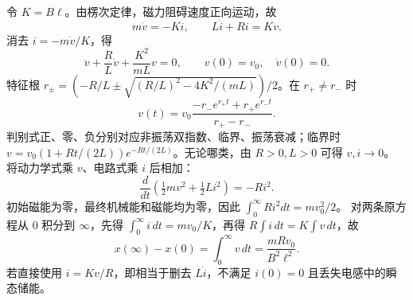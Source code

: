 令 \(K=B\ell\)。由楞次定律，磁力阻碍速度正向运动，故
\[m\dot v=-Ki,\qquad L\dot i+Ri=Kv.\]
消去 \(i=-m\dot v/K\)，得
\[\ddot v+\frac RL\dot v+\frac{K^2}{mL}v=0,\qquad v(0)=v_0,\quad\dot v(0)=0.\]
特征根 \(r_\pm=(-R/L\pm\sqrt{(R/L)^2-4K^2/(mL)})/2\)。在 \(r_+\ne r_-\) 时
\[v(t)=v_0\frac{-r_-e^{r_+t}+r_+e^{r_-t}}{r_+-r_-}.\]
判别式正、零、负分别对应非振荡双指数、临界、振荡衰减；临界时 \(v=v_0(1+Rt/(2L))e^{-Rt/(2L)}\)。无论哪类，由 \(R>0,L>0\) 可得 \(v,i\to0\)。
将动力学式乘 \(v\)、电路式乘 \(i\) 后相加：
\[\frac d{dt}\left(\tfrac12mv^2+\tfrac12Li^2\right)=-Ri^2.\]
初始磁能为零，最终机械能和磁能均为零，因此 \(\int_0^\infty Ri^2dt=mv_0^2/2\)。
对两条原方程从 \(0\) 积分到 \(\infty\)，先得 \(\int_0^\infty i\,dt=mv_0/K\)，再得 \(R\int i\,dt=K\int v\,dt\)，故
\[x(\infty)-x(0)=\int_0^\infty v\,dt=\frac{mRv_0}{B^2\ell^2}.\]
若直接使用 \(i=Kv/R\)，即相当于删去 \(L\dot i\)，不满足 \(i(0)=0\) 且丢失电感中的瞬态储能。
